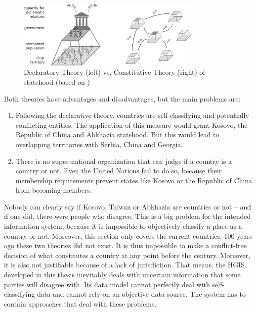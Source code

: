 \begin{figure}[ht]
  \vspace{1em}
  \centering
  \includegraphics[width=0.8\textwidth]{graphics/basics/countries/decl_const_theory}
  \caption{Declaratory Theory (left) vs. Constitutive Theory (right) of statehood (based on \cite{StateTheory})}
  \label{fig:declaratory_constitutive_theory}
\end{figure}

Both theories have advantages and disadvantages, but the main problems are:
\begin{enumerate}
  \item Following the declarative theory, countries are self-classifying and potentially conflicting entities. The application of this measure would grant Kosovo, the Republic of China and Abkhazia statehood. But this would lead to overlapping territories with Serbia, China and Georgia.
  \item There is no super-national organization that can judge if a country is a country or not. Even the United Nations fail to do so, because their membership requirements prevent states like Kosovo or the Republic of China from becoming members.
\end{enumerate}

Nobody can clearly say if Kosovo, Taiwan or Abkhazia are countries or not -- and if one did, there were people who disagree. This is a big problem for the intended information system, because it is impossible to objectively classify a place as a country or not. Moreover, this section only covers the current countries. 100 years ago these two theories did not exist. It is thus impossible to make a conflict-free decision of what constitutes a country at any point before the  century. Moreover, it is also not justifiable because of a lack of jurisdiction. That means, the HGIS developed in this thesis inevitably deals with uncertain information that some parties will disagree with. Its data model cannot perfectly deal with self-classifying data and cannot rely on an objective data source. The system has to contain approaches that deal with these problems.


